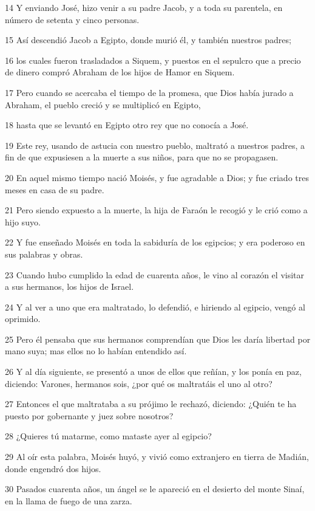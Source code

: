 \par 14 Y enviando José, hizo venir a su padre Jacob, y a toda su parentela, en número de setenta y cinco personas.
\par 15 Así descendió Jacob a Egipto, donde murió él, y también nuestros padres;
\par 16 los cuales fueron trasladados a Siquem, y puestos en el sepulcro que a precio de dinero compró Abraham de los hijos de Hamor en Siquem.
\par 17 Pero cuando se acercaba el tiempo de la promesa, que Dios había jurado a Abraham, el pueblo creció y se multiplicó en Egipto,
\par 18 hasta que se levantó en Egipto otro rey que no conocía a José.
\par 19 Este rey, usando de astucia con nuestro pueblo, maltrató a nuestros padres, a fin de que expusiesen a la muerte a sus niños, para que no se propagasen.
\par 20 En aquel mismo tiempo nació Moisés, y fue agradable a Dios; y fue criado tres meses en casa de su padre.
\par 21 Pero siendo expuesto a la muerte, la hija de Faraón le recogió y le crió como a hijo suyo.
\par 22 Y fue enseñado Moisés en toda la sabiduría de los egipcios; y era poderoso en sus palabras y obras.
\par 23 Cuando hubo cumplido la edad de cuarenta años, le vino al corazón el visitar a sus hermanos, los hijos de Israel.
\par 24 Y al ver a uno que era maltratado, lo defendió, e hiriendo al egipcio, vengó al oprimido.
\par 25 Pero él pensaba que sus hermanos comprendían que Dios les daría libertad por mano suya; mas ellos no lo habían entendido así.
\par 26 Y al día siguiente, se presentó a unos de ellos que reñían, y los ponía en paz, diciendo: Varones, hermanos sois, ¿por qué os maltratáis el uno al otro?
\par 27 Entonces el que maltrataba a su prójimo le rechazó, diciendo: ¿Quién te ha puesto por gobernante y juez sobre nosotros?
\par 28 ¿Quieres tú matarme, como mataste ayer al egipcio?
\par 29 Al oír esta palabra, Moisés huyó, y vivió como extranjero en tierra de Madián, donde engendró dos hijos.
\par 30 Pasados cuarenta años, un ángel se le apareció en el desierto del monte Sinaí, en la llama de fuego de una zarza.
